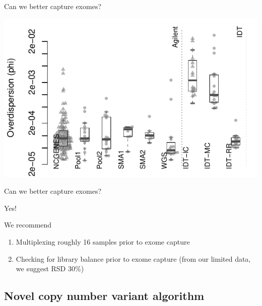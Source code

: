 \documentclass[
  10pt,
  ignorenonframetext,
  m]{beamer}
\begin{document}
\begin{frame}{Can we better capture exomes?}
\protect\hypertarget{can-we-better-capture-exomes-8}{}

\begin{center}\includegraphics{defense_files/figure-beamer/overallPhi-1} \end{center}

\end{frame}

\begin{frame}{Can we better capture exomes?}
\protect\hypertarget{can-we-better-capture-exomes-9}{}

\bigskip

\centering\Huge\textcolor{uncnavy}{Yes!}

\bigskip
\raggedright\normalsize

\begin{block}{We recommend}

\begin{enumerate}
\item
  Multiplexing roughly 16 samples prior to exome capture
\item
  Checking for library balance prior to exome capture (from our limited
  data, we suggest RSD 30\%)
\end{enumerate}

\end{block}

\end{frame}

\hypertarget{novel-copy-number-variant-algorithm}{%
\subsection{Novel copy number variant
algorithm}\label{novel-copy-number-variant-algorithm}}
\end{document}
